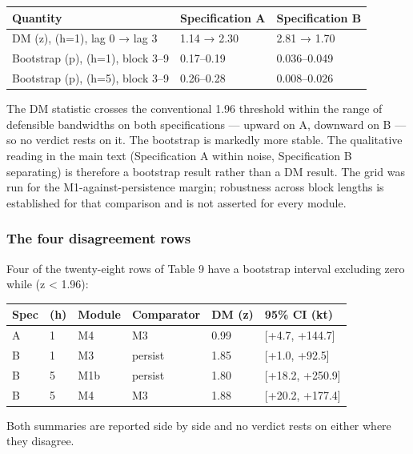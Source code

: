 \documentclass[11pt]{article}
\begin{document}
{\def\LTcaptype{none} %
\begin{longtable}[]{@{}lll@{}}
\toprule\noalign{}
Quantity & Specification A & Specification B \\
\midrule\noalign{}
\endhead
\bottomrule\noalign{}
\endlastfoot
DM (z), (h=1), lag 0 → lag 3 & 1.14 → 2.30 & 2.81 → 1.70 \\
Bootstrap (p), (h=1), block 3--9 & 0.17--0.19 & 0.036--0.049 \\
Bootstrap (p), (h=5), block 3--9 & 0.26--0.28 & 0.008--0.026 \\
\end{longtable}
}

The DM statistic crosses the conventional 1.96 threshold within the
range of defensible bandwidths on both specifications --- upward on A,
downward on B --- so no verdict rests on it. The bootstrap is markedly
more stable. The qualitative reading in the main text (Specification A
within noise, Specification B separating) is therefore a bootstrap
result rather than a DM result. The grid was run for the
M1-against-persistence margin; robustness across block lengths is
established for that comparison and is not asserted for every module.

\subsubsection{The four disagreement
rows}\label{the-four-disagreement-rows}

Four of the twenty-eight rows of Table 9 have a bootstrap interval
excluding zero while (\textbar z\textbar{} \textless{} 1.96):

{\def\LTcaptype{none} %
\begin{longtable}[]{@{}llllll@{}}
\toprule\noalign{}
Spec & (h) & Module & Comparator & DM (z) & 95\% CI (kt) \\
\midrule\noalign{}
\endhead
\bottomrule\noalign{}
\endlastfoot
A & 1 & M4 & M3 & 0.99 & {[}+4.7, +144.7{]} \\
B & 1 & M3 & persist & 1.85 & {[}+1.0, +92.5{]} \\
B & 5 & M1b & persist & 1.80 & {[}+18.2, +250.9{]} \\
B & 5 & M4 & M3 & 1.88 & {[}+20.2, +177.4{]} \\
\end{longtable}
}

Both summaries are reported side by side and no verdict rests on either
where they disagree.
\end{document}
